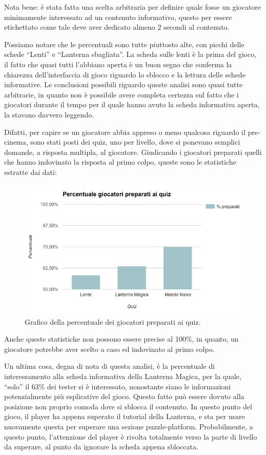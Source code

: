 Nota bene: è stata fatta una scelta arbitraria per definire quale fosse un giocatore minimamente interessato ad un contenuto informativo, questo per essere etichettato come tale deve aver dedicato almeno 2 secondi al contenuto.

Possiamo notare che le percentuali sono tutte piuttosto alte, con picchi delle schede ``Lenti'' e ``Lanterna sbagliata''. La scheda sulle lenti è la prima del gioco, il fatto che quasi tutti l'abbiano aperta è un buon segno che conferma la chiarezza dell'interfaccia di gioco riguardo lo sblocco e la lettura delle schede informative. Le conclusioni possibili riguardo queste analisi sono quasi tutte arbitrarie, in quanto non è possibile avere completa certezza sul fatto che i giocatori durante il tempo per il quale hanno avuto la scheda informativa aperta, la stavano davvero leggendo.

Difatti, per capire se un giocatore abbia appreso o meno qualcosa riguardo il pre-cinema, sono stati posti dei quiz, uno per livello, dove si ponevano semplici domande, a risposta multipla, al giocatore. Giudicando i giocatori preparati quelli che hanno indovinato la risposta al primo colpo, queste sono le statistiche estratte dai dati:

\begin{figure}[h]
\centerline{\includegraphics[scale=0.65]{images/risultati/test-quiz.png}}
\caption{Grafico della percentuale dei giocatori preparati ai quiz.}
\label{fig:test-quiz}
\end{figure}

Anche queste statistiche non possono essere precise al 100\%, in quanto, un giocatore potrebbe aver scelto a caso ed indovinato al primo colpo.

Un ultima cosa, degna di nota di questa analisi, è la percentuale di interessamento alla scheda informativa della Lanterna Magica, per la quale, ``solo'' il 63\% dei tester si è interessato, nonostante siano le informazioni potenzialmente più esplicative del gioco. Questo fatto può essere dovuto alla posizione non proprio comoda dove si sblocca il contenuto. In questo punto del gioco, il player ha appena superato il tutorial della Lanterna, e sta per usare nuovamente questa per superare una sezione puzzle-platform. Probabilmente, a questo punto, l'attenzione del player è rivolta totalmente verso la parte di livello da superare, al punto da ignorare la scheda appena sbloccata.

